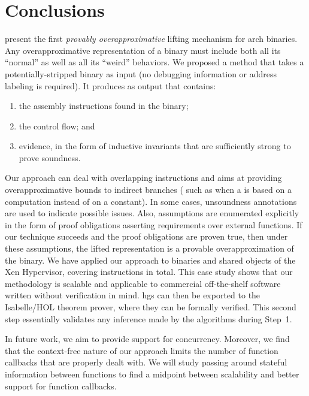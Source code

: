 \section{Conclusions}\label{hg-conclusion}
 present the first \emph{provably overapproximative} lifting mechanism for \gls{arch} binaries.
Any overapproximative representation of a binary must include both all its ``normal'' as well as all its ``weird'' behaviors.
We proposed a method that takes a potentially-stripped binary as input (no debugging information or address labeling is required).
It produces  as output that contains:
\begin{enumerate}
  \item the assembly instructions found in the binary;
  \item the control flow; and
  \item evidence, in the form of inductive invariants that are sufficiently strong to prove soundness.
\end{enumerate}
Our approach can deal with overlapping instructions and aims at providing overapproximative bounds to indirect branches ( such as when a  is based on a computation instead of on a constant).
In some cases, unsoundness annotations are used to indicate possible issues.
Also, assumptions are enumerated explicitly in the form of proof obligations asserting requirements over external functions.
If our technique succeeds and the proof obligations are proven true, then under these assumptions, the lifted representation is a provable overapproximation of the binary.
We have applied our approach to binaries and shared objects of the Xen Hypervisor, covering  instructions in total.
This case study shows that our methodology is scalable and applicable to commercial off-the-shelf software written without verification in mind.
\Acp{hg} can then be exported to the Isabelle/HOL theorem prover, where they can be formally verified.
This second step essentially validates any inference made by the algorithms during Step~1.

In future work, we aim to provide support for concurrency.
Moreover, we find that the context-free nature of our approach limits the number of function callbacks that are properly dealt with.
We will study passing around stateful information between functions to find a midpoint between scalability and better support for function callbacks.

